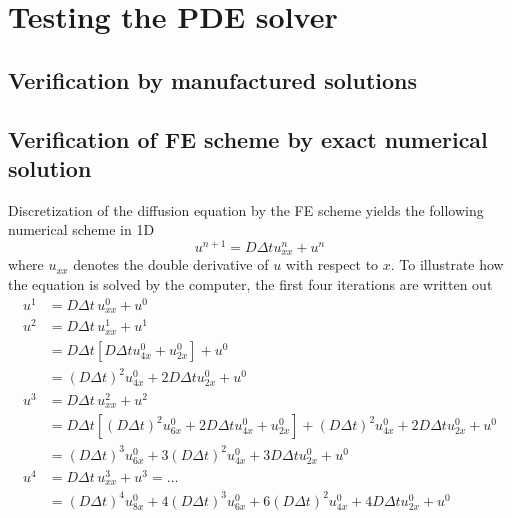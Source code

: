 \section{Testing the PDE solver}


\subsection{Verification by manufactured solutions}



\subsection{Verification of FE scheme by exact numerical solution}

Discretization of the diffusion equation by the FE scheme yields the following numerical scheme in 1D
\begin{equation}
 u^{n+1} = D\Delta t u^n_{xx} + u^n
\end{equation}
where $u_{xx}$ denotes the double derivative of $u$ with respect to $x$. 
To illustrate how the equation is solved by the computer, the first four iterations are written out
\begin{align*}
 u^1 &= D\Delta t\, u_{xx}^0 + u^0 \\
 u^2 &= D\Delta t\, u_{xx}^1 + u^1 \\
 &= D\Delta t\left[D\Delta t u_{4x}^0 + u_{2x}^0\right] + u^0\\
 &= \left(D\Delta t\right)^2 u_{4x}^0 + 2D\Delta t u_{2x}^0+ u^0 \\
 u^3 &= D\Delta t\, u_{xx}^2 + u^2 \\
 &= D\Delta t\left[\left(D\Delta t\right)^2 u_{6x}^0 + 2D\Delta t u_{4x}^0+ u_{2x}^0\right] + \left(D\Delta t\right)^2 u_{4x}^0 + 2D\Delta t u_{2x}^0+ u^0\\
 &= \left(D\Delta t\right)^3 u_{6x}^0 + 3\left(D\Delta t\right)^2 u_{4x}^0+ 3D\Delta tu_{2x}^0 + u^0 \\
 u^4 &= D\Delta t \,u_{xx}^3 + u^3 = \dots \\
 &= \left(D\Delta t\right)^4 u_{8x}^0 + 4\left(D\Delta t\right)^3 u_{6x}^0+ 6\left(D\Delta t\right)^2 u_{4x}^0 + 4D\Delta t u_{2x}^0 + u^0 
\end{align*}

